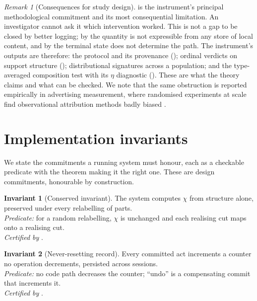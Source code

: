 \documentclass[11pt,a4paper]{article}
\theoremstyle{clstyle}
\theoremstyle{definition}
\newtheorem{binv}{Invariant}
\theoremstyle{remark}
\newtheorem{remark}[theorem]{Remark}
\newcommand{\Char}{\chi}
\begin{document}
\begin{remark}[Consequences for study design]
\label{rem:study-design}
 is the instrument's principal methodological
commitment and its most consequential limitation. An investigator cannot ask
it which intervention worked. This is not a gap to be closed by better
logging; by  the quantity is not expressible from any
store of local content, and by  the terminal state does not
determine the path. The instrument's outputs are therefore: the protocol and
its provenance (); ordinal verdicts on support
structure (); distributional signatures across a population;
and the type-averaged composition test with its $\eta$ diagnostic
(). These are what the theory claims and
what can be checked. We note that the same obstruction is reported
empirically in advertising measurement, where randomised experiments at scale
find observational attribution methods badly biased
\citep{lewis2015unfavorable,blake2015consumer,gordon2019comparison}.
\end{remark}

\section{Implementation invariants}
\label{sec:blueprint}

We state the commitments a running system must honour, each as a checkable
predicate with the theorem making it the right one. These are design
commitments, honourable by construction.

\begin{binv}[Conserved invariant]
\label{inv:char}
The system computes $\Char$ from structure alone, preserved under every
relabelling of parts.\\
\emph{Predicate:} for a random relabelling, $\Char$ is unchanged and each
realising cut maps onto a realising cut.\\
\emph{Certified by} .
\end{binv}

\begin{binv}[Never-resetting record]
\label{inv:record}
Every committed act increments a counter no operation decrements, persisted
across sessions.\\
\emph{Predicate:} no code path decreases the counter; ``undo'' is a
compensating commit that increments it.\\
\emph{Certified by} .
\end{binv}
\end{document}
